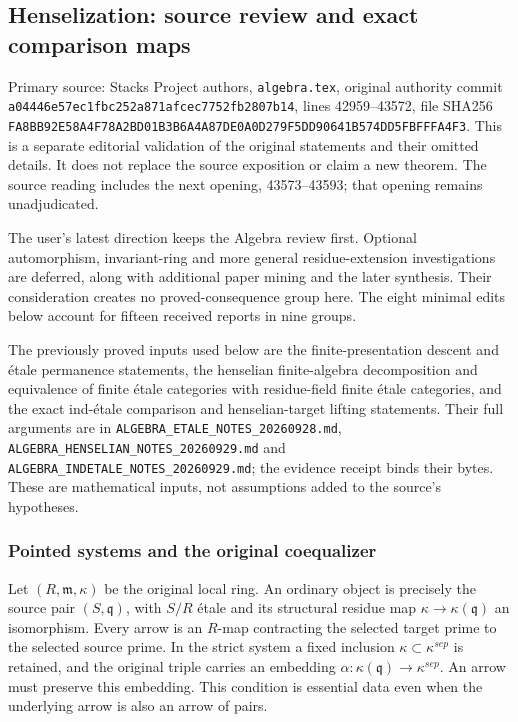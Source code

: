 \subsection{Henselization: source review and exact comparison maps}\label{henselization-source-review-and-exact-comparison-maps}

Primary source: Stacks Project authors, \texttt{algebra.tex}, original authority commit \texttt{a04446e57ec1fbc252a871afcec7752fb2807b14}, lines 42959--43572, file SHA256 \texttt{FA8BB92E58A4F78A2BD01B3B6A4A87DE0A0D279F5DD90641B574DD5FBFFFA4F3}. This is a separate editorial validation of the original statements and their omitted details. It does not replace the source exposition or claim a new theorem. The source reading includes the next opening, 43573--43593; that opening remains unadjudicated.

The user's latest direction keeps the Algebra review first. Optional automorphism, invariant-ring and more general residue-extension investigations are deferred, along with additional paper mining and the later synthesis. Their consideration creates no proved-consequence group here. The eight minimal edits below account for fifteen received reports in nine groups.

The previously proved inputs used below are the finite-presentation descent and étale permanence statements, the henselian finite-algebra decomposition and equivalence of finite étale categories with residue-field finite étale categories, and the exact ind-étale comparison and henselian-target lifting statements. Their full arguments are in \texttt{ALGEBRA\_ETALE\_NOTES\_20260928.md}, \texttt{ALGEBRA\_HENSELIAN\_NOTES\_20260929.md} and \texttt{ALGEBRA\_INDETALE\_NOTES\_20260929.md}; the evidence receipt binds their bytes. These are mathematical inputs, not assumptions added to the source's hypotheses.

\subsubsection{Pointed systems and the original coequalizer}\label{pointed-systems-and-the-original-coequalizer}

Let \((R,\mathfrak m,\kappa)\) be the original local ring. An ordinary object is precisely the source pair \((S,\mathfrak q)\), with \(S/R\) étale and its structural residue map \(\kappa\to\kappa(\mathfrak q)\) an isomorphism. Every arrow is an \(R\)-map contracting the selected target prime to the selected source prime. In the strict system a fixed inclusion \(\kappa\subset\kappa^{sep}\) is retained, and the original triple carries an embedding \(\alpha:\kappa(\mathfrak q)\to\kappa^{sep}\). An arrow must preserve this embedding. This condition is essential data even when the underlying arrow is also an arrow of pairs.

